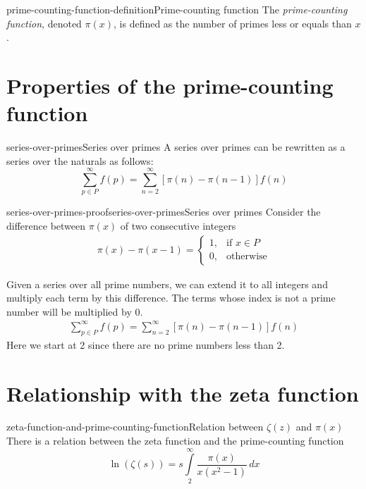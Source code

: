 \documentclass[preview]{standalone}
\begin{document}
\genpage

\begin{snippetdefinition}{prime-counting-function-definition}{Prime-counting function}
    The \textit{prime-counting function}, denoted \(\pi(x)\),
    is defined as the number of primes less or equals than \(x\).
\end{snippetdefinition}

\section{Properties of the prime-counting function}

\begin{snippetproposition}{series-over-primes}{Series over primes}
    A series over primes can be rewritten as a series over the naturals as follows:
    \[
        \sum_{p\in P}^{\infty}f(p)=\sum_{n=2}^{\infty}\left[\pi(n)-\pi(n-1)\right]f(n)
    \]
\end{snippetproposition}

\begin{snippetproof}{series-over-primes-proof}{series-over-primes}{Series over primes}
    Consider the difference between \(\pi(x)\) of two consecutive integers
    \begin{align*}
        \pi (x)-\pi (x-1)= 
        \begin{cases}
            1,& \text{if } x\in P
            \\
            0,& \text{otherwise}
        \end{cases}
    \end{align*}

    Given a series over all prime numbers, we can extend it to all integers and multiply each term by this difference.
    The terms whose index is not a prime number will be multiplied by 0.
    \begin{align*}
        \sum_{p\in P}^{\infty}f(p)=\sum_{n=2}^{\infty}\left[\pi(n)-\pi(n-1)\right]f(n)
    \end{align*}
    Here we start at 2 since there are no prime numbers less than 2.
\end{snippetproof}

\section{Relationship with the zeta function}

\begin{snippettheorem}{zeta-function-and-prime-counting-function}{Relation between \(\zeta(z)\) and \(\pi(x)\)}
    There is a relation between the zeta function and the prime-counting function
    \[
        \ln\left(\zeta(s)\right)=
        s\int\limits_2^\infty
        \frac{\pi(x)}{x(x^2-1)}\,dx
    \]
\end{snippettheorem}
\end{document}
